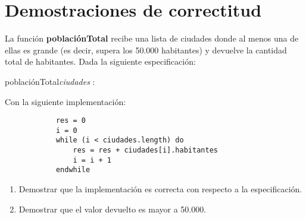 \documentclass[10pt,a4paper]{article}
\begin{document}



\vspace{8mm}



\section{Demostraciones de correctitud}

La función \textbf{poblaciónTotal} recibe una lista de ciudades donde al menos una de ellas es grande (es decir, supera los 50.000 habitantes) y devuelve la cantidad total de habitantes. Dada la siguiente especificación:

\vspace{2mm}


 \begin{proc}{poblaciónTotal}{\In \textit{ciudades} : }{\ent}
	\vspace{1.5mm}
	

\end{proc}

\vspace{2mm}

Con la siguiente implementación:

\begin{verbatim}
            res = 0
            i = 0
            while (i < ciudades.length) do
                res = res + ciudades[i].habitantes
                i = i + 1
            endwhile
\end{verbatim}

\begin{enumerate}
    \item Demostrar que la implementación es correcta con respecto a la especificación.
    \item Demostrar que el valor devuelto es mayor a 50.000.
\end{enumerate}
\end{document}
